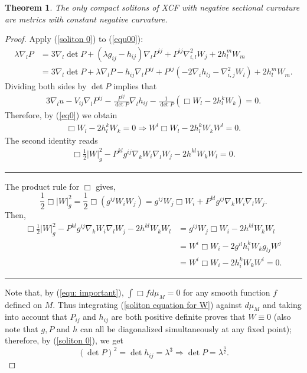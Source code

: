 \documentclass{amsart}
\newtheorem{theorem}{Theorem}
\theoremstyle{definition}
\theoremstyle{remark}
\numberwithin{equation}{section}
\newenvironment{note}{\hrule}{\hrule}
\begin{document}
\begin{theorem}
The only compact solitons of XCF with negative sectional curvature are metrics with constant negative curvature.
\end{theorem}
\begin{proof}
Apply (\ref{soliton 0}) to (\ref{equ00}):
\begin{align*}
\lambda \nabla_l P&=3\nabla_l\det P+(\lambda g_{ij}-h_{ij})\nabla_l P^{ij}+P^{ij}\nabla^2_{i,l}W_j+2h_l^mW_m\\
&=3\nabla_l\det P+\lambda \nabla_l P-h_{ij}\nabla_l P^{ij}+P^{ij}(-2\nabla_ih_{lj}-\nabla^2_{i,j}W_l)+2h_l^mW_m.
\end{align*}
Dividing both sides by $\det P$ implies that
\begin{align*}
3\nabla_lu-V_{ij}\nabla_l P^{ij}-\frac{P^{ij}}{\det P}\nabla_lh_{ij}-\frac{1}{\det P}(\Box W_l-2h_l^kW_k)=0.
\end{align*}
Therefore, by (\ref{eq0}) we obtain
\begin{align*}
\Box W_l-2h_l^kW_k=0\Rightarrow W^l\Box W_l-2h_l^kW_kW^l=0.
\end{align*}
The second identity reads
\begin{align}\label{soliton equation for W}
\Box \frac{1}{2}|W|_g^2-P^{kl}g^{ij}\nabla_kW_i\nabla_lW_j-2h^{kl}W_kW_l=0.
\end{align}

\begin{note}
The product rule for \(\Box\) gives,
\[
\frac{1}{2}\Box |W|_g^2 = \frac{1}{2} \Box(g^{ij} W_i W_j) = g^{ij} W_j \Box W_i + P^{kl} g^{ij} \nabla_k W_i \nabla_l W_j.
\]
Then,
\[
\begin{split}
\Box \frac{1}{2}|W|_g^2 - P^{kl}g^{ij}\nabla_kW_i\nabla_lW_j - 2h^{kl}W_kW_l &= g^{ij} W_j \Box W_i - 2 h^{kl}W_k W_l \\
&= W^i \Box W_i - 2 g^{il} h^k_i W_k g_{lj} W^j \\
&= W^i \Box W_i - 2 h^k_i W_k W^i = 0.
\end{split}
\]
\end{note}

Note that, by (\ref{equ: important}), $\int \Box fd\mu_{M}=0$ for any smooth function $f$ defined on $M$. Thus integrating (\ref{soliton equation for W}) against $d\mu_{M}$ and taking into account that $P_{ij}$ and $h_{ij}$ are both positive definite proves that $W\equiv0$ (also note that $g,P$ and $h$ can all be diagonalized simultaneously at any fixed point); therefore, by (\ref{soliton 0}), we get
\[(\det P)^2=\det h_{ij}=\lambda ^3\Rightarrow \det P=\lambda^{\frac{3}{2}}.\]


\end{proof}
\end{document}
